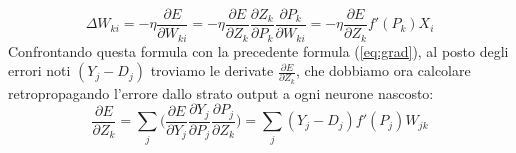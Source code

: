 \documentclass[10pt,a4paper]{article}
\begin{document}
\begin{equation} \label{eq:dih}
\Delta W_{ki} = -\eta \frac{\partial E}{\partial W_{ki}} = - \eta \frac{\partial E}{\partial Z_k} \frac{\partial Z_k}{\partial P_k} \frac{\partial P_k}{\partial W_{ki}} = -\eta \frac{\partial E}{\partial Z_k}f'(P_k)X_i
\end{equation}
Confrontando questa formula con la precedente formula (\ref{eq:grad}), al posto degli errori noti $(Y_j - D_j)$ troviamo le derivate $\frac{\partial E}{\partial Z_k}$, che dobbiamo ora calcolare retropropagando l'errore dallo strato output a ogni neurone nascosto:
\begin{equation} 
\frac{\partial E}{\partial Z_k} = \sum_j \Bigg( \frac{\partial E}{\partial Y_j} \frac{\partial Y_j}{\partial P_j} \frac{\partial P_j}{\partial Z_k} \Bigg) = \sum_j (Y_j - D_j)f'(P_j)W_{jk} 
\end{equation}
\end{document}

